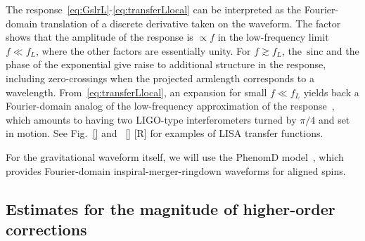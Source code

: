 \documentclass[aps,showpacs,twocolumn,
prd,superscriptaddress,nofootinbib]{revtex4-1}
\newcommand{\sinc}{\,\mathrm{sinc}}
\newcommand{\SM}[1]{{\color{Red} #1}}
\begin{document}
The response~\eqref{eq:GslrL}-\eqref{eq:transferLlocal} can be interpreted as the Fourier-domain translation of a discrete derivative taken on the waveform. The factor shows that the amplitude of the response is $\propto f$ in the low-frequency limit $f\ll f_{L}$, where the other factors are essentially unity. For $f\gtrsim f_{L}$, the $\sinc$ and the phase of the exponential give raise to additional structure in the response, including zero-crossings when the projected armlength corresponds to a wavelength. From~\eqref{eq:transferLlocal}, an expansion for small $f\ll f_{L}$ yields back a Fourier-domain analog of the low-frequency approximation of the response~\cite{Cutler97, RCP04}, which amounts to having two LIGO-type interferometers turned by $\pi/4$ and set in motion. See Fig.~\ref{} and ~\ref{} \SM{[R]} for examples of LISA transfer functions.

For the gravitational waveform itself, we will use the PhenomD model~\cite{Khan+15,Husa+15}, which provides Fourier-domain inspiral-merger-ringdown waveforms for aligned spins.


\subsection{Estimates for the magnitude of higher-order corrections}
\label{subsec:lisafom}
\end{document}
